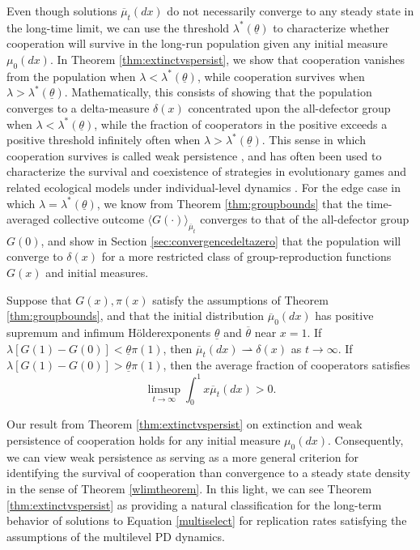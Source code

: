 \documentclass[11pt]{article}
\numberwithin{equation}{section}
\newcommand{\ds}{\displaystyle}
\newcommand{\ol}{\overline}
\newcommand{\holder}{H{\"o}lder\:}
\begin{document}
{Even though solutions $\ol{\mu}_t(dx)$ do not necessarily converge to any steady state in the long-time limit, we can use the threshold $\lambda^*(\underline{\theta})$ to characterize whether cooperation will survive in the long-run population given any initial measure $\mu_0(dx)$. In Theorem \ref{thm:extinctvspersist}, we show that cooperation vanishes from the population when $\lambda < \lambda^*(\underline{\theta})$, while cooperation survives when $\lambda > \lambda^*(\underline{\theta})$. Mathematically, this consists of showing that the population converges to a delta-measure $\delta(x)$ concentrated upon the all-defector group when $\lambda < \lambda^*(\underline{\theta})$, while the fraction of cooperators in the positive exceeds a positive threshold infinitely often when $\lambda > \lambda^*(\underline{\theta})$. This sense in which cooperation survives is called weak persistence \cite{freedman1990persistence}, and has often been used to characterize the survival and coexistence of strategies in evolutionary games and related ecological models under individual-level dynamics \cite{hofbauer1981general,hofbauer1998evolutionary,hofbauer2004persist,bratus2017solutions,freedman1990persistence}. For the edge case in which $\lambda = \lambda^*(\underline{\theta})$, we know from Theorem \ref{thm:groupbounds} that the time-averaged collective outcome $\langle G(\cdot) \rangle_{\ol{\mu}_t}$ converges to that of the all-defector group $G(0)$, and show in Section \ref{sec:convergencedeltazero} that the population will converge to $\delta(x)$ for a more restricted class of group-reproduction functions $G(x)$ and initial measures.

\begin{theorem} \label{thm:extinctvspersist}
Suppose that $G(x), \pi(x)$ satisfy the assumptions of Theorem \ref{thm:groupbounds}, and that the initial distribution $\overline{\mu}_0(dx)$ has positive supremum and infimum \holder exponents $\underline{\theta}$ and $\overline{\theta}$ near $x=1$. If $\lambda \left[G(1) - G(0) \right] < \underline{\theta} \pi(1)$, then $\ol{\mu}_t(dx) \rightharpoonup \delta(x)$ as $t \to \infty$. If $\lambda \left[G(1) - G(0) \right] > \underline{\theta} \pi(1)$, then the average fraction of cooperators satisfies
\begin{equation}
    \ds\limsup_{t \to \infty} \int_0^1 x \overline{\mu}_t(dx) > 0.
\end{equation}
\end{theorem} 

Our result from Theorem \ref{thm:extinctvspersist} on extinction and weak persistence of cooperation holds for any initial measure $\mu_0(dx)$. Consequently, we can view weak persistence as serving as a more general criterion for identifying the survival of cooperation than convergence to a steady state density in the sense of Theorem \ref{wlimtheorem}. In this light, we can see Theorem \ref{thm:extinctvspersist} as providing a natural classification for the long-term behavior of solutions to Equation \eqref{multiselect} for replication rates satisfying the assumptions of the multilevel PD dynamics.


}
\end{document}

